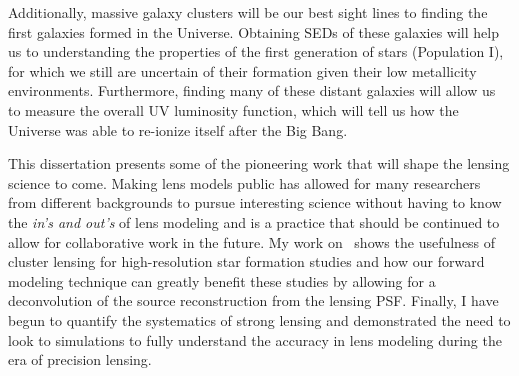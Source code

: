 Additionally, massive galaxy clusters will be our best sight lines to finding the first galaxies formed in the Universe. Obtaining SEDs of these galaxies will help us to understanding the properties of the first generation of stars (Population I), for which we still are uncertain of their formation given their low metallicity environments. Furthermore, finding many of these distant galaxies will allow us to measure the overall UV luminosity function, which will tell us how the Universe was able to re-ionize itself after the Big Bang.

This dissertation presents some of the pioneering work that will shape the lensing science to come. Making lens models public has allowed for many researchers from different backgrounds to pursue interesting science without having to know the {\it in's and out's} of lens modeling and is a practice that should be continued to allow for collaborative work in the future. My work on \giantarc\ shows the usefulness of cluster lensing for high-resolution star formation studies and how our forward modeling technique can greatly benefit these studies by allowing for a deconvolution of the source reconstruction from the lensing PSF. Finally, I have begun to quantify the systematics of strong lensing and demonstrated the need to look to simulations to fully understand the accuracy in lens modeling during the era of precision lensing.


